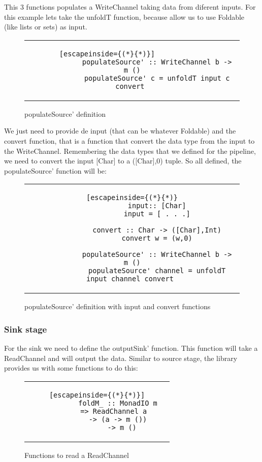 This 3 functions populates a WriteChannel taking data from diferent inputs. 
For this example lets take the unfoldT function, because allow us to use Foldable (like lists or sets) as input. 

\begin{figure}[H]
    \centering
    \begin{tabular}{c}
        \begin{lstlisting}[escapeinside={(*}{*)}]            
            populateSource' :: WriteChannel b -> m ()
            populateSource' c = unfoldT input c convert 
        \end{lstlisting}
    \end{tabular}
    \caption{populateSource' definition}
    \label{fig:DP21}
\end{figure}

We just need to provide de input (that can be whatever Foldable) and the convert function, that is a function that convert the data type from the input to the WriteChannel. 
Remembering the data types that we defined for the pipeline, we need to convert the input [Char] to a ([Char],0) tuple. 
So all defined, the populateSource' function will be: 

\begin{figure}[H]
    \centering
    \begin{tabular}{c}
        \begin{lstlisting}[escapeinside={(*}{*)}
            input:: [Char]
            input = [ . . .]

            convert :: Char -> ([Char],Int)
            convert w = (w,0)

            populateSource' :: WriteChannel b -> m ()
            populateSource' channel = unfoldT input channel convert 
        \end{lstlisting}
    \end{tabular}
    \caption{populateSource' definition with input and convert functions}
    \label{fig:DP22}
\end{figure}

\subsubsection{Sink stage}
For the sink we need to define the outputSink' function. 
This function will take a ReadChannel and will output the data.
Similar to source stage, the library provides us with some functions to do this: 

\begin{figure}[H]
    \centering
    \begin{tabular}{c}
        \begin{lstlisting}[escapeinside={(*}{*)}]
            foldM_ :: MonadIO m	 
            => ReadChannel a	
            -> (a -> m ())	
            -> m ()
        \end{lstlisting}
    \end{tabular}
    \caption{Functions to read a ReadChannel}
    \label{fig:DP23}
\end{figure}

